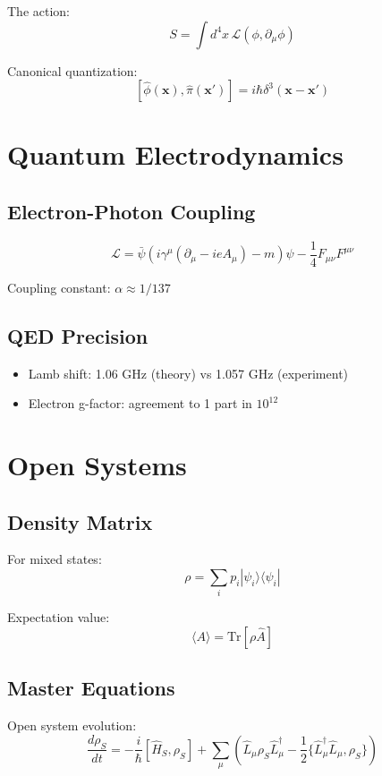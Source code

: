 \documentclass[12pt]{book}
\begin{document}
The action:
$$S = \int d^4x \, \mathcal{L}(\phi, \partial_\mu\phi)$$

Canonical quantization:
$$[\hat{\phi}(\mathbf{x}), \hat{\pi}(\mathbf{x}')] = i\hbar\delta^3(\mathbf{x} - \mathbf{x}')$$

\chapter{Quantum Electrodynamics}

\section{Electron-Photon Coupling}

$$\mathcal{L} = \bar{\psi}(i\gamma^\mu(\partial_\mu - ieA_\mu) - m)\psi - \frac{1}{4}F_{\mu\nu}F^{\mu\nu}$$

Coupling constant: $\alpha \approx 1/137$

\section{QED Precision}

\begin{itemize}
  \item Lamb shift: 1.06 GHz (theory) vs 1.057 GHz (experiment)
  \item Electron g-factor: agreement to 1 part in $10^{12}$
\end{itemize}

\chapter{Open Systems}

\section{Density Matrix}

For mixed states:
$$\rho = \sum_i p_i |\psi_i\rangle\langle\psi_i|$$

Expectation value:
$$\langle A \rangle = \text{Tr}[\rho\hat{A}]$$

\section{Master Equations}

Open system evolution:
$$\frac{d\rho_S}{dt} = -\frac{i}{\hbar}[\hat{H}_S, \rho_S] + \sum_\mu \left(\hat{L}_\mu\rho_S\hat{L}_\mu^\dagger - \frac{1}{2}\{\hat{L}_\mu^\dagger\hat{L}_\mu, \rho_S\}\right)$$
\end{document}
